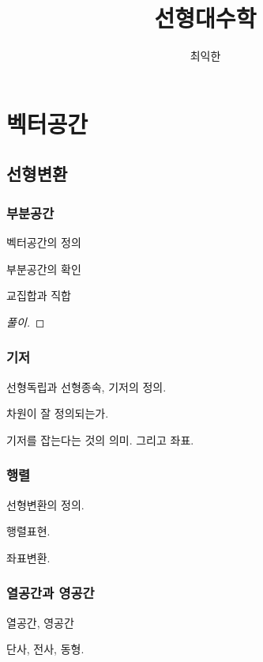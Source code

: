 \documentclass{../../large}
\begin{document}
\title{선형대수학}
\author{최익한}
\maketitle
\tableofcontents





\part{벡터공간}

\chapter{선형변환}

\section{부분공간}



벡터공간의 정의

부분공간의 확인

교집합과 직합


\begin{example}
\end{example}
\begin{proof}[풀이]

\end{proof}


\section{기저}
선형독립과 선형종속, 기저의 정의.

차원이 잘 정의되는가.

기저를 잡는다는 것의 의미. 그리고 좌표.


\section{행렬}

선형변환의 정의.

행렬표현.

좌표변환.




\section{열공간과 영공간}
열공간, 영공간

단사, 전사, 동형.
\end{document}
